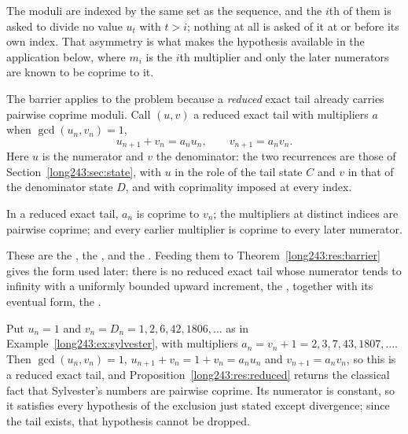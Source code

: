 The moduli are indexed by the same set as the sequence, and the $i$th of them
is asked to divide no value $u_t$ with $t>i$; nothing at all is asked of it at
or before its own index.  That asymmetry is what makes the hypothesis available
in the application below, where $m_i$ is the $i$th multiplier and only the
later numerators are known to be coprime to it.

The barrier applies to the problem because a \emph{reduced} exact tail already
carries pairwise coprime moduli.  Call $(u,v)$ a reduced exact tail with
multipliers $a$ when $\gcd(u_n,v_n)=1$,
\[
 u_{n+1}+v_n=a_nu_n,\qquad v_{n+1}=a_nv_n .
\]
Here $u$ is the numerator and $v$ the denominator: the two recurrences are
those of Section~\ref{long243:sec:state}, with $u$ in the role of the tail state $C$
and $v$ in that of the denominator state $D$, and with coprimality imposed at
every index.

\begin{proposition}\label{long243:res:reduced}
In a reduced exact tail, $a_n$ is coprime to $v_n$; the multipliers at distinct
indices are pairwise coprime; and every earlier multiplier is coprime to every
later numerator.
\end{proposition}

\noindent These are the
, the
, and the
.  Feeding them to Theorem~\ref{long243:res:barrier} gives the form used
later: there is no reduced exact tail whose numerator tends to infinity with a
uniformly bounded upward increment, the
, together with its eventual form, the
.

\begin{example}\label{long243:ex:reduced}
Put $u_n=1$ and $v_n=D_n=1,2,6,42,1806,\ldots$ as in
Example~\ref{long243:ex:sylvester}, with multipliers $a_n=v_n+1=2,3,7,43,1807,\ldots$.
Then $\gcd(u_n,v_n)=1$, $u_{n+1}+v_n=1+v_n=a_nu_n$ and $v_{n+1}=a_nv_n$, so
this is a reduced exact tail, and Proposition~\ref{long243:res:reduced} returns the
classical fact that Sylvester's numbers are pairwise coprime.  Its numerator is
constant, so it satisfies every hypothesis of the exclusion just stated except
divergence; since the tail exists, that hypothesis cannot be dropped.
\end{example}


